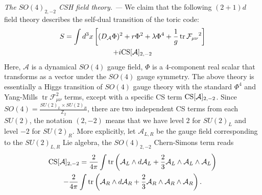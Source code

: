 \documentclass[aps, prl, superscriptaddress, twocolumn,
notitlepage, longbibliography,
floatfix]{revtex4-2}
\newcommand{\1}{\text{\uppercase\expandafter{\romannumeral1}}}
\newcommand{\2}{\text{\uppercase\expandafter{\romannumeral2}}}
\newcommand{\3}{\text{\uppercase\expandafter{\romannumeral3}}}
\newcommand{\4}{\text{\uppercase\expandafter{\romannumeral4}}}
\newcommand{\5}{\text{\uppercase\expandafter{\romannumeral5}}}
\newcommand{\6}{\text{\uppercase\expandafter{\romannumeral6}}}
\begin{document}
\textit{The $SO(4)_{2,-2}$ CSH field theory. ---}
We claim that the following $(2+1)d$ field theory describes the self-dual transition of the toric code:
\begin{multline}
    S=\int d^3x\left[(D_{\mathcal{A}}\Phi)^2+r\Phi^2+\lambda\Phi^4+\frac{1}{g}\operatorname{tr}\mathcal{F_{\mu\nu}}^2\right]\\+i{\rm CS}[\mathcal{A}]_{2,-2}
    \label{eq:2,-2Higgs}
\end{multline}
Here, $\mathcal{A}$ is a dynamical $SO(4)$ gauge field, $\Phi$ is a $4$-component real scalar that transforms as a vector under the $SO(4)$ gauge symmetry. The above theory is essentially a Higgs transition of $SO(4)$ gauge theory with the standard $\Phi^4$ and Yang-Mills $\operatorname{tr}\mathcal{F}_{\mu\nu}^2$ terms, except with a specific CS term $\rm CS[\mathcal{A}]_{2,-2}$. Since $SO(4)=\frac{SU(2)_L\times SU(2)_R}{\mathbb{Z}_2}$, there are two independent CS terms from each $SU(2)$, the notation $(2,-2)$ means that we have level $2$ for $SU(2)_L$ and level $-2$ for $SU(2)_R$. More explicitly, let $\mathcal{A}_{L,R}$ be the gauge field corresponding to the $SU(2)_{L,R}$ Lie algebra, the $SO(4)_{2,-2}$ Chern-Simons term reads
\begin{multline}
    {\rm CS}[\mathcal{A}]_{2,-2}=\frac{2}{4\pi}\int {\rm tr}\left(\mathcal{A}_L\wedge d\mathcal{A}_L+\frac{2}{3}\mathcal{A}_L\wedge\mathcal{A}_L\wedge\mathcal{A}_L \right) \nonumber \\
    -\frac{2}{4\pi}\int {\rm tr}\left(\mathcal{A}_R\wedge d\mathcal{A}_R+\frac{2}{3}\mathcal{A}_R\wedge\mathcal{A}_R\wedge\mathcal{A}_R \right). \nonumber
\end{multline}
\end{document}
